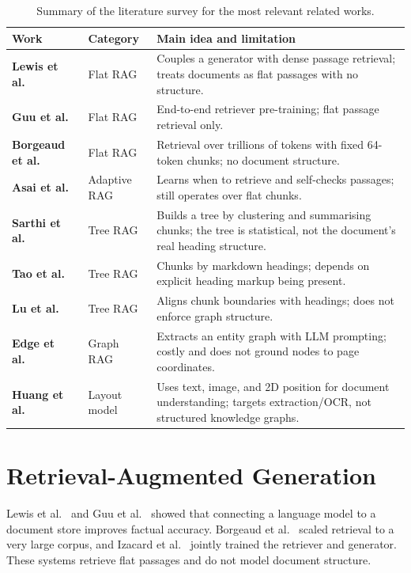 \documentclass[12pt,a4paper]{report}
\begin{document}
\begin{table}[!htbp]
\centering
\caption{Summary of the literature survey for the most relevant related works.}
\label{tab:litsurvey}
\renewcommand{\arraystretch}{1.3}
{\small
\begin{tabularx}{\textwidth}{@{} >{\bfseries}p{2.5cm} p{3.0cm} X @{}}
\toprule
Work & Category & Main idea and limitation \\ \midrule
Lewis et al.~\cite{lewis2020rag} & Flat RAG & Couples a generator with dense passage
retrieval; treats documents as flat passages with no structure. \\
Guu et al.~\cite{guu2020realm} & Flat RAG & End-to-end retriever pre-training; flat
passage retrieval only. \\
Borgeaud et al.~\cite{borgeaud2022retro} & Flat RAG & Retrieval over trillions of
tokens with fixed 64-token chunks; no document structure. \\
Asai et al.~\cite{asai2024selfrag} & Adaptive RAG & Learns when to retrieve and
self-checks passages; still operates over flat chunks. \\
Sarthi et al.~\cite{sarthi2024raptor} & Tree RAG & Builds a tree by clustering and
summarising chunks; the tree is statistical, not the document's real heading structure. \\
Tao et al.~\cite{tao2025treerag} & Tree RAG & Chunks by markdown headings; depends on
explicit heading markup being present. \\
Lu et al.~\cite{lu2026hichunk} & Tree RAG & Aligns chunk boundaries with headings;
does not enforce graph structure. \\
Edge et al.~\cite{edge2024graphrag} & Graph RAG & Extracts an entity graph with LLM
prompting; costly and does not ground nodes to page coordinates. \\
Huang et al.~\cite{huang2022layoutlmv3} & Layout model & Uses text, image, and 2D
position for document understanding; targets extraction/OCR, not structured knowledge
graphs. \\ \bottomrule
\end{tabularx}}
\end{table}

\section{Retrieval-Augmented Generation}
Lewis et al.~\cite{lewis2020rag} and Guu et al.~\cite{guu2020realm} showed that
connecting a language model to a document store improves factual accuracy. Borgeaud et
al.~\cite{borgeaud2022retro} scaled retrieval to a very large corpus, and Izacard et
al.~\cite{izacard2023atlas} jointly trained the retriever and generator. These systems
retrieve flat passages and do not model document structure.
\end{document}
